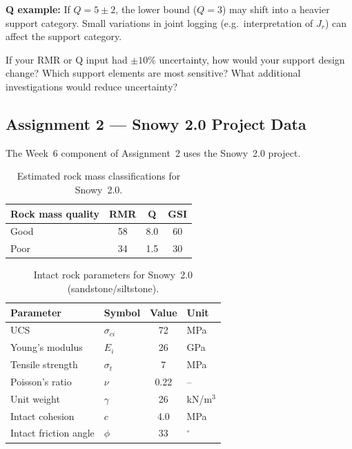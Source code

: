 \documentclass[a4paper,12pt]{article}
\begin{document}
\textbf{Q example:} If $Q = 5 \pm 2$, the lower bound ($Q = 3$) may shift into a heavier support category. Small variations in joint logging (e.g.\ interpretation of $J_r$) can affect the support category.

\begin{notebox}
If your RMR or Q input had $\pm10\%$ uncertainty, how would your support design change? Which support elements are most sensitive? What additional investigations would reduce uncertainty?
\end{notebox}

\subsection{Assignment 2 --- Snowy 2.0 Project Data}
The Week~6 component of Assignment~2 uses the Snowy~2.0 project.

\begin{table}[ht]
\centering
\small
\begin{tabular}{lccc}
\toprule
\textbf{Rock mass quality} & \textbf{RMR} & \textbf{Q} & \textbf{GSI} \\
\midrule
Good & 58 & 8.0 & 60 \\
Poor & 34 & 1.5 & 30 \\
\bottomrule
\end{tabular}
\caption{Estimated rock mass classifications for Snowy~2.0.}
\end{table}

\begin{table}[ht]
\centering
\small
\begin{tabular}{llcl}
\toprule
\textbf{Parameter} & \textbf{Symbol} & \textbf{Value} & \textbf{Unit} \\
\midrule
UCS & $\sigma_{ci}$ & 72 & MPa \\
Young's modulus & $E_i$ & 26 & GPa \\
Tensile strength & $\sigma_t$ & 7 & MPa \\
Poisson's ratio & $\nu$ & 0.22 & -- \\
Unit weight & $\gamma$ & 26 & kN/m$^3$ \\
Intact cohesion & $c$ & 4.0 & MPa \\
Intact friction angle & $\phi$ & 33 & $^\circ$ \\
\bottomrule
\end{tabular}
\caption{Intact rock parameters for Snowy~2.0 (sandstone/siltstone).}
\end{table}
\end{document}
